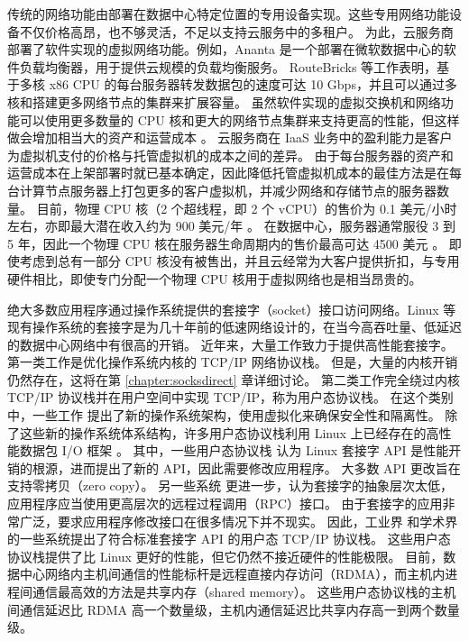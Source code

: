 传统的网络功能由部署在数据中心特定位置的专用设备实现。这些专用网络功能设备不仅价格高昂，也不够灵活，不足以支持云服务中的多租户。
为此，云服务商部署了软件实现的虚拟网络功能。例如，Ananta \cite {ananta} 是一个部署在微软数据中心的软件负载均衡器，用于提供云规模的负载均衡服务。
RouteBricks \cite {routebricks} 等工作表明，基于多核 x86 CPU 的每台服务器转发数据包的速度可达 10 Gbps，并且可以通过多核和搭建更多网络节点的集群来扩展容量。
虽然软件实现的虚拟交换机和网络功能可以使用更多数量的 CPU 核和更大的网络节点集群来支持更高的性能，但这样做会增加相当大的资产和运营成本 \cite {ananta,duet}。
云服务商在 IaaS 业务中的盈利能力是客户为虚拟机支付的价格与托管虚拟机的成本之间的差异。
由于每台服务器的资产和运营成本在上架部署时就已基本确定，因此降低托管虚拟机成本的最佳方法是在每台计算节点服务器上打包更多的客户虚拟机，并减少网络和存储节点的服务器数量。
目前，物理 CPU 核（2 个超线程，即 2 个 vCPU）的售价为 0.1 美元/小时左右，亦即最大潜在收入约为 900 美元/年 \cite{smartnic}。
在数据中心，服务器通常服役 3 到 5 年，因此一个物理 CPU 核在服务器生命周期内的售价最高可达 4500 美元 \cite{smartnic}。
即使考虑到总有一部分 CPU 核没有被售出，并且云经常为大客户提供折扣，与专用硬件相比，即使专门分配一个物理 CPU 核用于虚拟网络也是相当昂贵的。

绝大多数应用程序通过操作系统提供的套接字（socket）接口访问网络。Linux 等现有操作系统的套接字是为几十年前的低速网络设计的，在当今高吞吐量、低延迟的数据中心网络中有很高的开销。
近年来，大量工作致力于提供高性能套接字。
第一类工作是优化操作系统内核的 TCP/IP 网络协议栈。
但是，大量的内核开销仍然存在，这将在第 \ref {chapter:socksdirect} 章详细讨论。
第二类工作完全绕过内核 TCP/IP 协议栈并在用户空间中实现 TCP/IP，称为用户态协议栈。
在这个类别中，一些工作 \cite {belay2017ix,peter2016arrakis} 提出了新的操作系统架构，使用虚拟化来确保安全性和隔离性。
除了这些新的操作系统体系结构，许多用户态协议栈利用 Linux 上已经存在的高性能数据包 I/O 框架 \cite {rizzo2012netmap,dpdk,pf-ring}。
其中，一些用户态协议栈 \cite {marinos2014network,jeong2014mtcp,seastar,fstack} 认为 Linux 套接字 API 是性能开销的根源，进而提出了新的 API，因此需要修改应用程序。
大多数 API 更改旨在支持零拷贝（zero copy）。
另一些系统  \cite {kalia2016fasst,kalia2018datacenter} 更进一步，认为套接字的抽象层次太低，应用程序应当使用更高层次的远程过程调用（RPC）接口。
由于套接字的应用非常广泛，要求应用程序修改接口在很多情况下并不现实。
因此，工业界 \cite{libvma,openonload,dbl} 和学术界 \cite{huang2017high} 的一些系统提出了符合标准套接字 API 的用户态 TCP/IP 协议栈。
这些用户态协议栈提供了比 Linux 更好的性能，但它仍然不接近硬件的性能极限。
目前，数据中心网络内主机间通信的性能标杆是远程直接内存访问（RDMA），而主机内进程间通信最高效的方法是共享内存（shared memory）。
这些用户态协议栈的主机间通信延迟比 RDMA 高一个数量级，主机内通信延迟比共享内存高一到两个数量级。

